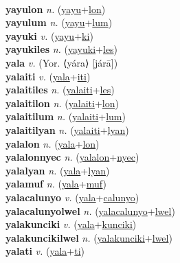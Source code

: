  \label{yayu} \\
\textbf{yayulon} \textit{n.} (\hyperref[yayu]{yayu}+\hyperref[lon]{lon})
 \label{yayulon} \\
\textbf{yayulum} \textit{n.} (\hyperref[yayu]{yayu}+\hyperref[lum]{lum})
 \label{yayulum} \\
\textbf{yayuki} \textit{v.} (\hyperref[yayu]{yayu}+\hyperref[ki]{ki})
 \label{yayuki} \\
\textbf{yayukiles} \textit{n.} (\hyperref[yayuki]{yayuki}+\hyperref[les]{les})
 \label{yayukiles} \\
\textbf{yala} \textit{v.} (Yor. ⟨yára⟩ [járā])
 \label{yala} \\
\textbf{yalaiti} \textit{v.} (\hyperref[yala]{yala}+\hyperref[iti]{iti})
 \label{yalaiti} \\
\textbf{yalaitiles} \textit{n.} (\hyperref[yalaiti]{yalaiti}+\hyperref[les]{les})
 \label{yalaitiles} \\
\textbf{yalaitilon} \textit{n.} (\hyperref[yalaiti]{yalaiti}+\hyperref[lon]{lon})
 \label{yalaitilon} \\
\textbf{yalaitilum} \textit{n.} (\hyperref[yalaiti]{yalaiti}+\hyperref[lum]{lum})
 \label{yalaitilum} \\
\textbf{yalaitilyan} \textit{n.} (\hyperref[yalaiti]{yalaiti}+\hyperref[lyan]{lyan})
 \label{yalaitilyan} \\
\textbf{yalalon} \textit{n.} (\hyperref[yala]{yala}+\hyperref[lon]{lon})
 \label{yalalon} \\
\textbf{yalalonnyec} \textit{n.} (\hyperref[yalalon]{yalalon}+\hyperref[nyec]{nyec})
 \label{yalalonnyec} \\
\textbf{yalalyan} \textit{n.} (\hyperref[yala]{yala}+\hyperref[lyan]{lyan})
 \label{yalalyan} \\
\textbf{yalamuf} \textit{n.} (\hyperref[yala]{yala}+\hyperref[muf]{muf})
 \label{yalamuf} \\
\textbf{yalacalunyo} \textit{v.} (\hyperref[yala]{yala}+\hyperref[calunyo]{calunyo})
 \label{yalacalunyo} \\
\textbf{yalacalunyolwel} \textit{n.} (\hyperref[yalacalunyo]{yalacalunyo}+\hyperref[lwel]{lwel})
 \label{yalacalunyolwel} \\
\textbf{yalakunciki} \textit{v.} (\hyperref[yala]{yala}+\hyperref[kunciki]{kunciki})
 \label{yalakunciki} \\
\textbf{yalakuncikilwel} \textit{n.} (\hyperref[yalakunciki]{yalakunciki}+\hyperref[lwel]{lwel})
 \label{yalakuncikilwel} \\
\textbf{yalati} \textit{v.} (\hyperref[yala]{yala}+\hyperref[ti]{ti})
